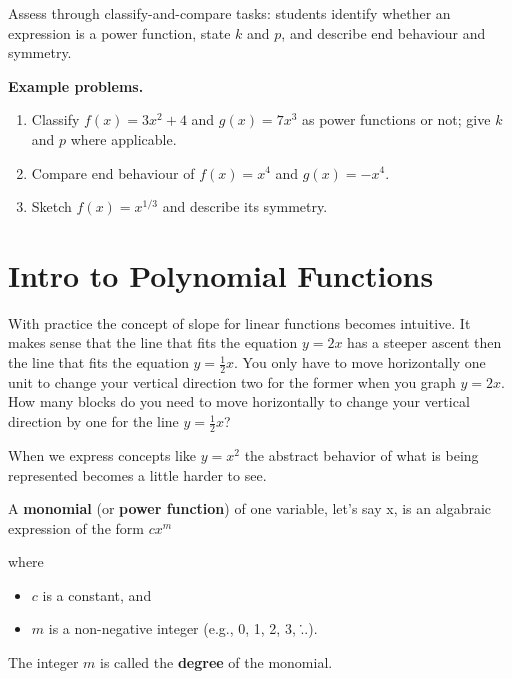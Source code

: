 Assess through classify-and-compare tasks: students identify whether an
expression is a power function, state $k$ and $p$, and describe end
behaviour and symmetry.

\textbf{Example problems.}
\begin{enumerate}
    \item Classify $f(x)=3x^2+4$ and $g(x)=7x^3$ as power functions
          or not; give $k$ and $p$ where applicable.
    \item Compare end behaviour of $f(x)=x^4$ and $g(x)=-x^4$.
    \item Sketch $f(x)=x^{1/3}$ and describe its symmetry.
\end{enumerate}



\section{Intro to Polynomial Functions}
\label{sec:intr-7564}


With practice the concept of slope for linear functions becomes intuitive. It makes sense
that the line that fits the equation $y=2x$ has a steeper ascent then the line that fits
the equation $y=\frac{1}{2}x$. You only have to move horizontally one unit to change your
vertical direction two for the former when you graph $y=2x$. How many blocks do you need
to move horizontally to change your vertical direction by one for the line
$y=\frac{1}{2}x$?



When we express concepts like $y=x^2$ the abstract behavior of what is being represented
becomes a little harder to see.



A \textbf{monomial} (or \textbf{power function}) of one variable, let's say x, is an
algabraic expression of the form $c x^m $



where



\begin{itemize}
    \item $c$ is a constant, and
    \item $m$ is a non-negative integer (e.g., 0, 1, 2, 3, \...).
\end{itemize}

The integer $m$ is called the \textbf{degree} of the monomial.



